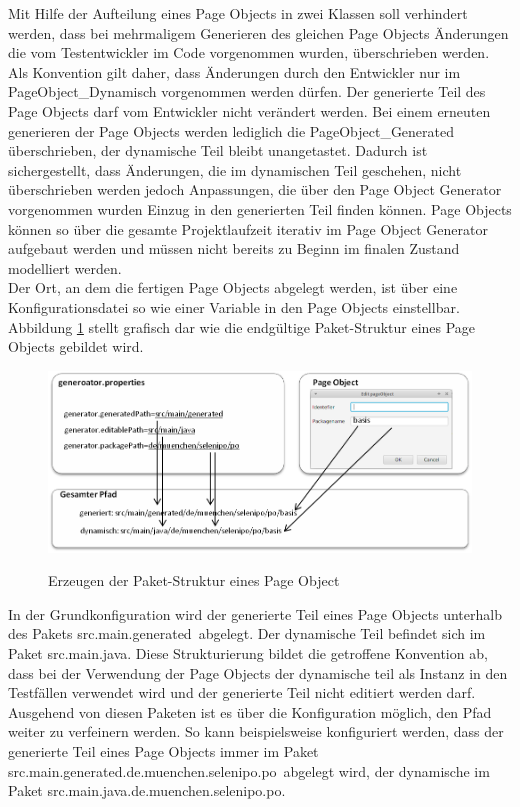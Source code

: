 Mit Hilfe der Aufteilung eines Page Objects in zwei Klassen soll verhindert werden, dass bei mehrmaligem Generieren des gleichen Page Objects Änderungen die vom Testentwickler im Code vorgenommen wurden, überschrieben werden. Als Konvention gilt daher, dass Änderungen durch den Entwickler nur im PageObject\_Dynamisch vorgenommen werden dürfen. Der generierte Teil des Page Objects darf vom Entwickler nicht verändert werden.
Bei einem erneuten generieren der Page Objects werden lediglich die PageObject\_Generated überschrieben, der dynamische Teil bleibt unangetastet.
Dadurch ist sichergestellt, dass Änderungen, die im dynamischen Teil geschehen, nicht überschrieben werden jedoch Anpassungen, die über den Page Object Generator vorgenommen wurden Einzug in den generierten Teil finden können.
Page Objects können so über die gesamte Projektlaufzeit iterativ im Page Object Generator aufgebaut werden und müssen nicht bereits zu Beginn im finalen Zustand modelliert werden.\\
Der Ort, an dem die fertigen Page Objects abgelegt werden, ist über eine Konfigurationsdatei so wie einer Variable in den Page Objects einstellbar. 
Abbildung \ref{fig:packagepath} stellt grafisch dar wie die endgültige Paket-Struktur eines Page Objects gebildet wird.
\begin{figure}[htb]
  \centering  
  \includegraphics[scale=0.8]{img/packagePath.png}\\
  \caption{Erzeugen der Paket-Struktur eines Page Object}
  \label{fig:packagepath}
\end{figure}
In der Grundkonfiguration wird der generierte Teil eines Page Objects unterhalb des Pakets \grq src.main.generated\grq\ abgelegt. Der dynamische Teil befindet sich im Paket \grq src.main.java\grq.
Diese Strukturierung bildet die getroffene Konvention ab, dass bei der Verwendung der Page Objects der dynamische teil als Instanz in den Testfällen verwendet wird und der generierte Teil nicht editiert werden darf.
Ausgehend von diesen Paketen ist es über die Konfiguration möglich, den Pfad weiter zu verfeinern werden. So kann beispielsweise konfiguriert werden, dass der generierte Teil eines Page Objects immer im Paket \grq src.main.generated.de.muenchen.selenipo.po\grq\ abgelegt wird, der dynamische im Paket \grq src.main.java.de.muenchen.selenipo.po\grq.\\

